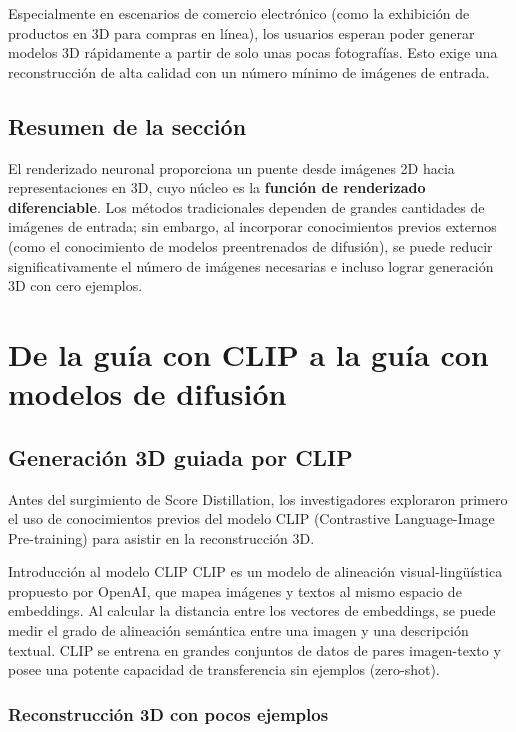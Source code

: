 \documentclass[a4paper]{article}
\begin{document}
Especialmente en escenarios de comercio electrónico (como la exhibición de productos en 3D para compras en línea), los usuarios esperan poder generar modelos 3D rápidamente a partir de solo unas pocas fotografías. Esto exige una reconstrucción de alta calidad con un número mínimo de imágenes de entrada.

\subsection{Resumen de la sección}

El renderizado neuronal proporciona un puente desde imágenes 2D hacia representaciones en 3D, cuyo núcleo es la \textbf{función de renderizado diferenciable}. Los métodos tradicionales dependen de grandes cantidades de imágenes de entrada; sin embargo, al incorporar conocimientos previos externos (como el conocimiento de modelos preentrenados de difusión), se puede reducir significativamente el número de imágenes necesarias e incluso lograr generación 3D con cero ejemplos.

\newpage

\section{De la guía con CLIP a la guía con modelos de difusión}

\subsection{Generación 3D guiada por CLIP}

Antes del surgimiento de Score Distillation, los investigadores exploraron primero el uso de conocimientos previos del modelo CLIP (Contrastive Language-Image Pre-training) para asistir en la reconstrucción 3D.

\begin{knowledgebox}{Introducción al modelo CLIP}
CLIP es un modelo de alineación visual-lingüística propuesto por OpenAI, que mapea imágenes y textos al mismo espacio de embeddings. Al calcular la distancia entre los vectores de embeddings, se puede medir el grado de alineación semántica entre una imagen y una descripción textual. CLIP se entrena en grandes conjuntos de datos de pares imagen-texto y posee una potente capacidad de transferencia sin ejemplos (zero-shot).
\end{knowledgebox}

\subsubsection{Reconstrucción 3D con pocos ejemplos}
\end{document}
